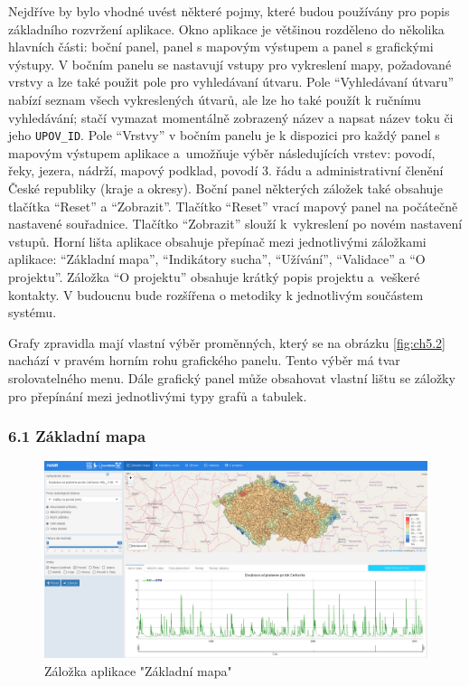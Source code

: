 \documentclass[12pt,]{article}
\begin{document}
\qquad Nejdříve by bylo vhodné uvést některé pojmy, které budou
používány pro popis základního rozvržení aplikace. Okno aplikace je
většinou rozděleno do několika hlavních části: boční panel, panel s
mapovým výstupem a panel s grafickými výstupy. V bočním panelu se
nastavují vstupy pro vykreslení mapy, požadované vrstvy a lze také
použit pole pro vyhledávaní útvaru. Pole \enquote{Vyhledávaní útvaru}
nabízí seznam všech vykreslených útvarů, ale lze ho také použít k
ručnímu vyhledávání; stačí vymazat momentálně zobrazený název a napsat
název toku či jeho \texttt{UPOV\_ID}. Pole \enquote{Vrstvy} v bočním
panelu je k dispozici pro každý panel s mapovým výstupem aplikace
a~umožňuje výběr následujících vrstev: povodí, řeky, jezera, nádrží,
mapový podklad, povodí 3. řádu a administrativní členění České republiky
(kraje a okresy). Boční panel některých záložek také obsahuje tlačítka
\enquote{Reset} a \enquote{Zobrazit}. Tlačítko \enquote{Reset} vrací
mapový panel na počátečně nastavené souřadnice. Tlačítko
\enquote{Zobrazit} slouží k~vykreslení po novém nastavení vstupů. Horní
lišta aplikace obsahuje přepínač mezi jednotlivými záložkami aplikace:
\enquote{Základní mapa}, \enquote{Indikátory sucha}, \enquote{Užívání},
\enquote{Validace} a \enquote{O projektu}. Záložka \enquote{O projektu}
obsahuje krátký popis projektu a~veškeré kontakty. V budoucnu bude
rozšířena o metodiky k jednotlivým součástem systému.

\qquad Grafy zpravidla mají vlastní výběr proměnných, který se na
obrázku \ref{fig:ch5.2} nachází v pravém horním rohu grafického panelu.
Tento výběr má tvar srolovatelného menu. Dále grafický panel může
obsahovat vlastní lištu se záložky pro přepínání mezi jednotlivými typy
grafů a tabulek.

\subsubsection{6.1 Základní mapa}\label{zakladni-mapa}

\begin{figure}[H]
      \includegraphics[width=\textwidth]{fig/P_ZM}
      \caption{Záložka aplikace "Základní mapa"}
      \label{fig:ch5.3}
\end{figure}
\end{document}
